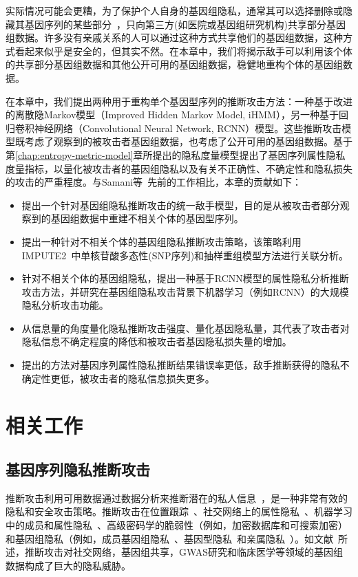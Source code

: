 实际情况可能会更糟，为了保护个人自身的基因组隐私，通常其可以选择删除或隐藏其基因序列的某些部分~\cite{shi2017overview}，只向第三方(如医院或基因组研究机构)共享部分基因组数据。许多没有亲戚关系的人可以通过这种方式共享他们的基因组数据，这种方式看起来似乎是安全的，但其实不然。在本章中，我们将揭示敌手可以利用该个体的共享部分基因组数据和其他公开可用的基因组数据，稳健地重构个体的基因组数据。

在本章中，我们提出两种用于重构单个基因型序列的推断攻击方法：一种基于改进的离散隐Markov模型（Improved Hidden Markov Model, iHMM），另一种基于回归卷积神经网络（Convolutional Neural Network, RCNN）模型。这些推断攻击模型既考虑了观察到的被攻击者基因组数据，也考虑了公开可用的基因组数据。基于第\ref{chap:entropy-metric-model}章所提出的隐私度量模型提出了基因序列属性隐私度量指标，以量化被攻击者的基因组隐私以及有关不正确性、不确定性和隐私损失的攻击的严重程度。与Samani等~\cite{samani2015quantifying}先前的工作相比，本章的贡献如下：
\begin{itemize}
	\item 提出一个针对基因组隐私推断攻击的统一敌手模型，目的是从被攻击者部分观察到的基因组数据中重建不相关个体的基因型序列。
	\item 提出一种针对不相关个体的基因组隐私推断攻击策略，该策略利用IMPUTE2~\cite{howie2009flexible}中单核苷酸多态性(SNP序列)和抽样重组模型方法进行关联分析。
	\item 针对不相关个体的基因组隐私，提出一种基于RCNN模型的属性隐私分析推断攻击方法，并研究在基因组隐私攻击背景下机器学习（例如RCNN）的大规模隐私分析攻击功能。
	\item 从信息量的角度量化隐私推断攻击强度、量化基因隐私量，其代表了攻击者对隐私信息不确定程度的降低和被攻击者基因隐私损失量的增加。
	\item 提出的方法对基因序列属性隐私推断结果错误率更低，敌手推断获得的隐私不确定性更低，被攻击者的隐私信息损失更多。
\end{itemize}

\section{相关工作}\label{sec:relat}
\subsection{基因序列隐私推断攻击}

推断攻击利用可用数据通过数据分析来推断潜在的私人信息~\cite{en2018inference}，是一种非常有效的隐私和安全攻击策略。推断攻击在位置跟踪~\cite{narain2016inferring}、社交网络上的属性隐私~\cite{gong2016you}、机器学习中的成员和属性隐私~\cite{shokri2017membership,ganju2018property}、高级密码学的脆弱性（例如，加密数据库和可搜索加密）~\cite{pouliot2016shadow} 和基因组隐私（例如，成员基因组隐私~\cite{wang2009learning}、基因型隐私~\cite{samani2015quantifying,he2017addressing}和亲属隐私~\cite{humbert2013addressing}）。如文献~\cite{ayday2017inference}所述，推断攻击对社交网络，基因组共享，GWAS研究和临床医学等领域的基因组数据构成了巨大的隐私威胁。

